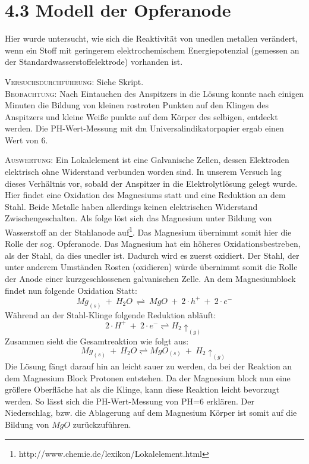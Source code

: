 \documentclass[A4paper, 11p]{article}
\begin{document}
\newpage
\section{4.3 Modell der Opferanode}

Hier wurde untersucht, wie sich die Reaktivität von unedlen metallen verändert, wenn ein Stoff mit geringerem elektrochemischem Energiepotenzial (gemessen an der Standardwasserstoffelektrode) vorhanden ist.
 
\textsc{Versuchsdurchführung:} Siehe Skript.\\

\textsc{Beobachtung:}\hspace{5mm} Nach Eintauchen des Anspitzers in die Lösung konnte nach einigen Minuten die Bildung von kleinen rostroten Punkten auf den Klingen des Anspitzers und kleine Weiße punkte auf dem Körper des selbigen, entdeckt werden. Die PH-Wert-Messung mit dm Universalindikatorpapier ergab einen Wert von 6.

\textsc{Auswertung:}\hspace{8mm} Ein Lokalelement ist eine Galvanische Zellen, dessen Elektroden elektrisch ohne Widerstand verbunden worden sind. In unserem Versuch lag dieses Verhältnis vor, sobald der Anspitzer in die Elektrolytlösung gelegt wurde. Hier findet eine Oxidation des Magnesiums statt und eine Reduktion an dem Stahl. Beide Metalle haben allerdings keinen elektrischen Widerstand Zwischengeschalten. Als folge löst sich das Magnesium unter Bildung von Wasserstoff an der Stahlanode auf\footnote{http://www.chemie.de/lexikon/Lokalelement.html}. Das Magnesium übernimmt somit hier die Rolle der sog. Opferanode. Das Magnesium hat ein höheres Oxidationsbestreben, als der Stahl, da dies unedler ist. Dadurch wird es zuerst oxidiert. Der Stahl, der unter anderem Umständen Rosten (oxidieren) würde übernimmt somit die Rolle der Anode einer kurzgeschlossenen galvanischen Zelle. An dem Magnesiumblock findet nun folgende Oxidation Statt: $$Mg_{(s)}\ +\ H_2O\ \rightleftharpoons\ MgO\ +\ 2\cdot h^+\ +\ 2\cdot e^-$$ Während an der Stahl-Klinge folgende Reduktion abläuft: $$2\cdot H^+\ +\ 2\cdot e^- \rightleftharpoons H_{2}\uparrow_{(g)}$$ Zusammen sieht die Gesamtreaktion wie folgt aus: $$Mg_{(s)}\ +\ H_2O \rightleftharpoons MgO_{(s)} \ +\ H_{2}\uparrow_{(g)}$$ Die Lösung fängt darauf hin an leicht sauer zu werden, da bei der Reaktion an dem Magnesium Block Protonen entstehen. Da der Magnesium block nun eine größere Oberfläche hat als die Klinge, kann diese Reaktion leicht bevorzugt werden. So lässt sich die PH-Wert-Messung von PH=6 erklären. Der Niederschlag, bzw. die Ablagerung auf dem Magnesium Körper ist somit auf die Bildung von $MgO$ zurückzuführen.
\end{document}
